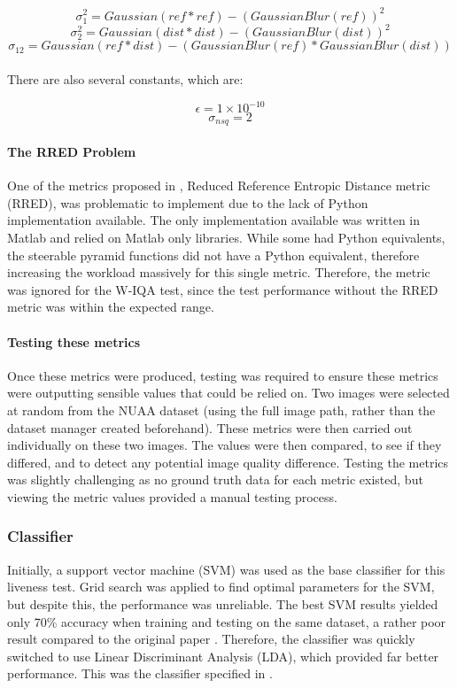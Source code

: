 \documentclass[10pt,a4paper]{article}
\begin{document}
                $$\sigma_{1}^2 = Gaussian(ref * ref) - (GaussianBlur(ref))^2$$
                $$\sigma_{2}^2 = Gaussian(dist * dist) - (GaussianBlur(dist))^2$$
                $$\sigma_{12} = Gaussian(ref * dist) - (GaussianBlur(ref) * GaussianBlur(dist))$$\\


                There are also several constants, which are:


                $$\epsilon = 1 \times 10^{-10}$$
                $$\sigma_{nsq} = 2$$

            \paragraph{The RRED Problem}
            One of the metrics proposed in \cite{ImageQualityAssessmentTest}, Reduced Reference Entropic Distance metric (RRED), was problematic to implement due to the lack of Python implementation available.
            The only implementation available was written in Matlab and relied on Matlab only libraries. While some had Python equivalents, the steerable pyramid functions did not have a Python equivalent, therefore increasing the workload massively for this single metric. Therefore, the metric was ignored for the W-IQA
            test, since the test performance without the RRED metric was within the expected range. 
            
            \paragraph{Testing these metrics}
            Once these metrics were produced, testing was required to ensure these metrics were outputting sensible values that could be relied on.
            Two images were selected at random from the NUAA dataset (using the full image path, rather than the dataset manager created beforehand). These metrics were then carried out individually on these two images. The values were then compared, to see if they differed, and to detect any potential image quality difference. 
            Testing the metrics was slightly challenging as no ground truth data for each metric existed, but viewing the metric values provided a manual testing process.


        \subsubsection{Classifier}
            Initially, a support vector machine (SVM) was used as the base classifier for this liveness test. Grid search was applied to find optimal parameters for the SVM, but despite this, the performance was unreliable. The best SVM results yielded only 70\% accuracy when training and testing on the same dataset, a rather poor result compared to the original paper \cite{ImageQualityAssessmentTest}. Therefore, the classifier was quickly switched to use Linear Discriminant Analysis (LDA), which provided far better performance. This was the classifier specified in \cite{ImageQualityAssessmentTest}.
\end{document}
